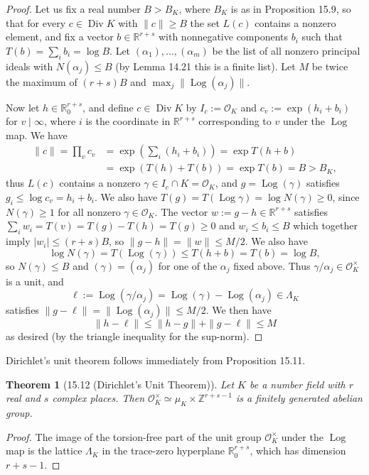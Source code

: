 \documentclass[UTF8,11pt]{ctexart}
\newtheorem*{theorem}{Theorem}
\begin{document}
\begin{proof}
Let us fix a real number $B>B_K$, where $B_K$ is as in Proposition 15.9, so that for every $c\in\operatorname{Div}K$ with $\|c\|\geq B$ the set $L(c)$ contains a nonzero element, and fix a vector $b\in\mathbb R^{r+s}$ with nonnegative components $b_i$ such that $T(b)=\sum_i b_i=\log B$. Let $(\alpha_1),\ldots,(\alpha_m)$ be the list of all nonzero principal ideals with $N(\alpha_j)\leq B$ (by Lemma 14.21 this is a finite list). Let $M$ be twice the maximum of $(r+s)B$ and $\max_j\|\operatorname{Log}(\alpha_j)\|$.

Now let $h\in\mathbb R^{r+s}_0$, and define $c\in\operatorname{Div}K$ by $I_c:=\mathcal O_K$ and $c_v:=\exp(h_i+b_i)$ for $v\mid\infty$, where $i$ is the coordinate in $\mathbb R^{r+s}$ corresponding to $v$ under the $\operatorname{Log}$ map. We have
\begin{align*}
\|c\|=\prod_v c_v
&=\exp\left(\sum_i(h_i+b_i)\right)
=\exp T(h+b)\\
&=\exp(T(h)+T(b))=\exp T(b)=B>B_K,
\end{align*}
thus $L(c)$ contains a nonzero $\gamma\in I_c\cap K=\mathcal O_K$, and $g=\operatorname{Log}(\gamma)$ satisfies $g_i\leq\log c_v=h_i+b_i$. We also have $T(g)=T(\operatorname{Log}\gamma)=\log N(\gamma)\geq0$, since $N(\gamma)\geq1$ for all nonzero $\gamma\in\mathcal O_K$. The vector $w:=g-h\in\mathbb R^{r+s}$ satisfies $\sum_i w_i=T(v)=T(g)-T(h)=T(g)\geq0$ and $w_i\leq b_i\leq B$ which together imply $|w_i|\leq(r+s)B$, so $\|g-h\|=\|w\|\leq M/2$. We also have
\[
\log N(\gamma)=T(\operatorname{Log}(\gamma))\leq T(h+b)=T(b)=\log B,
\]
so $N(\gamma)\leq B$ and $(\gamma)=(\alpha_j)$ for one of the $\alpha_j$ fixed above. Thus $\gamma/\alpha_j\in\mathcal O_K^\times$ is a unit, and
\[
\ell:=\operatorname{Log}(\gamma/\alpha_j)=\operatorname{Log}(\gamma)-\operatorname{Log}(\alpha_j)\in\Lambda_K
\]
satisfies $\|g-\ell\|=\|\operatorname{Log}(\alpha_j)\|\leq M/2$. We then have
\[
\|h-\ell\|\leq\|h-g\|+\|g-\ell\|\leq M
\]
as desired (by the triangle inequality for the sup-norm).
\end{proof}

Dirichlet's unit theorem follows immediately from Proposition 15.11.
\begin{theorem}[15.12 (Dirichlet's Unit Theorem)]
Let $K$ be a number field with $r$ real and $s$ complex places. Then $\mathcal O_K^\times\simeq\mu_K\times\mathbb Z^{r+s-1}$ is a finitely generated abelian group.
\end{theorem}
\begin{proof}
The image of the torsion-free part of the unit group $\mathcal O_K^\times$ under the $\operatorname{Log}$ map is the lattice $\Lambda_K$ in the trace-zero hyperplane $\mathbb R^{r+s}_0$, which has dimension $r+s-1$.
\end{proof}
\end{document}
